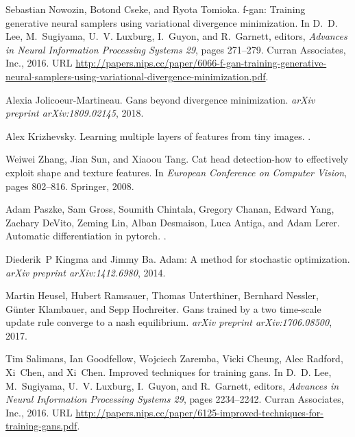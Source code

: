 \documentclass{article}
\begin{document}
\begin{thebibliography}{25}
	Sebastian Nowozin, Botond Cseke, and Ryota Tomioka.
	\newblock f-gan: Training generative neural samplers using variational
	divergence minimization.
	\newblock In D.~D. Lee, M.~Sugiyama, U.~V. Luxburg, I.~Guyon, and R.~Garnett,
	editors, \emph{Advances in Neural Information Processing Systems 29}, pages
	271--279. Curran Associates, Inc., 2016.
	\newblock URL
	\url{http://papers.nips.cc/paper/6066-f-gan-training-generative-neural-samplers-using-variational-divergence-minimization.pdf}.
	
	Alexia Jolicoeur-Martineau.
	\newblock Gans beyond divergence minimization.
	\newblock \emph{arXiv preprint arXiv:1809.02145}, 2018.
	
	Alex Krizhevsky.
	\newblock Learning multiple layers of features from tiny images.
	.
	
	Weiwei Zhang, Jian Sun, and Xiaoou Tang.
	\newblock Cat head detection-how to effectively exploit shape and texture
	features.
	\newblock In \emph{European Conference on Computer Vision}, pages 802--816.
	Springer, 2008.
	
	Adam Paszke, Sam Gross, Soumith Chintala, Gregory Chanan, Edward Yang, Zachary
	DeVito, Zeming Lin, Alban Desmaison, Luca Antiga, and Adam Lerer.
	\newblock Automatic differentiation in pytorch.
	.
	
	Diederik~P Kingma and Jimmy Ba.
	\newblock Adam: A method for stochastic optimization.
	\newblock \emph{arXiv preprint arXiv:1412.6980}, 2014.
	
	Martin Heusel, Hubert Ramsauer, Thomas Unterthiner, Bernhard Nessler,
	G{\"u}nter Klambauer, and Sepp Hochreiter.
	\newblock Gans trained by a two time-scale update rule converge to a nash
	equilibrium.
	\newblock \emph{arXiv preprint arXiv:1706.08500}, 2017.
	
	Tim Salimans, Ian Goodfellow, Wojciech Zaremba, Vicki Cheung, Alec Radford,
	Xi~Chen, and Xi~Chen.
	\newblock Improved techniques for training gans.
	\newblock In D.~D. Lee, M.~Sugiyama, U.~V. Luxburg, I.~Guyon, and R.~Garnett,
	editors, \emph{Advances in Neural Information Processing Systems 29}, pages
	2234--2242. Curran Associates, Inc., 2016.
	\newblock URL
	\url{http://papers.nips.cc/paper/6125-improved-techniques-for-training-gans.pdf}.
	

\end{thebibliography}
\end{document}
